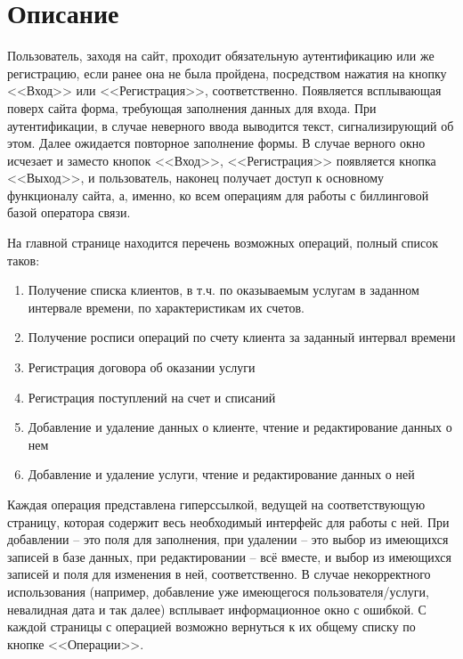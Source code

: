 \documentclass[oneside,senior,etd]{BYUPhysForDegree}
\begin{document}
\fixmargins
\makepreliminarypages
\oneandhalfspace
     
 
\newpage
\section{Описание}

Пользователь, заходя на сайт, проходит обязательную аутентификацию или же регистрацию, если ранее она не была пройдена, посредством нажатия на кнопку <<Вход>> или <<Регистрация>>, соответственно. Появляется всплывающая поверх сайта форма, требующая заполнения данных для входа. При аутентификации, в случае неверного ввода выводится текст, сигнализирующий об этом. Далее ожидается повторное заполнение формы. В случае верного окно исчезает и заместо кнопок <<Вход>>, <<Регистрация>> появляется кнопка <<Выход>>, и пользователь, наконец получает доступ к основному функционалу сайта, а, именно, ко всем операциям для работы с биллинговой базой оператора связи.

На главной странице находится перечень возможных операций, полный список таков:
\begin{enumerate}
    \item Получение списка клиентов, в т.ч. по оказываемым услугам в заданном интервале времени, по характеристикам их счетов.
    \item Получение росписи операций по счету клиента за заданный интервал времени
    \item Регистрация договора об оказании услуги
    \item Регистрация поступлений на счет и списаний
    \item Добавление и удаление данных о клиенте, чтение и редактирование данных о нем
    \item Добавление и удаление услуги, чтение и редактирование данных о ней
\end{enumerate}

\newpage
Каждая операция представлена гиперссылкой, ведущей на соответствующую страницу, которая содержит весь необходимый интерфейс для работы с ней. При добавлении -- это поля для заполнения, при удалении -- это выбор из имеющихся записей в базе данных, при редактировании -- всё вместе, и выбор из имеющихся записей и поля для изменения в ней, соответственно. В случае некорректного использования (например, добавление уже имеющегося пользователя/услуги, невалидная дата и так далее) всплывает информационное окно с ошибкой. С каждой страницы с операцией возможно вернуться к их общему списку по кнопке <<Операции>>.
\end{document}
